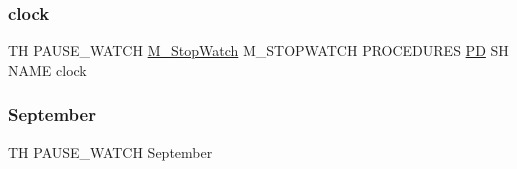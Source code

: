 \subsubsection{\texorpdfstring{clock}{clock}}
{\footnotesize\ttfamily TH P\+A\+U\+S\+E\+\_\+\+W\+A\+T\+CH \hyperlink{option__stopwatch_83_8txt_aa2011fc45a5e502e87ee50996a8a9305}{M\+\_\+\+Stop\+Watch} M\+\_\+\+S\+T\+O\+P\+W\+A\+T\+CH P\+R\+O\+C\+E\+D\+U\+R\+ES \hyperlink{what__overview_81_8txt_a85f26da5a4481fbdb0d9c79f2b94de3e}{PD} SH N\+A\+ME clock}

\mbox{\label{pause__watch_83_8txt_a9c7b5c1b7a2e7848e0da5b3d021ecba9}} 
\subsubsection{\texorpdfstring{September}{September}}
{\footnotesize\ttfamily TH P\+A\+U\+S\+E\+\_\+\+W\+A\+T\+CH September}

